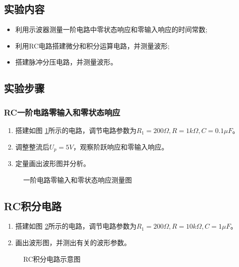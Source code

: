\documentclass[a4paper,11pt,UTF8]{ctexart}
\begin{document}
\subsection{实验内容}
\begin{itemize}
  \item 利用示波器测量一阶电路中零状态响应和零输入响应的时间常数;
  \item 利用RC电路搭建微分和积分运算电路，并测量波形;
  \item 搭建脉冲分压电路，并测量波形。
\end{itemize}
	
\subsection{实验步骤}
  \subsubsection{RC一阶电路零输入和零状态响应}
  \begin{enumerate}
    \item 搭建如图 \ref{fig:react}所示的电路，调节电路参数为$R_1=200\Omega,R=1k\Omega,C=0.1\mu F$。
    \item 调整整流后$U_p=5V$，观察阶跃响应和零输入响应。
    \item 定量画出波形图并分析。
  \end{enumerate}
  \begin{figure}[htbp]
    \centering
    \caption{一阶电路零输入和零状态响应测量图}
    \label{fig:react}
    \end{figure}
  \subsection{RC积分电路}
  \begin{enumerate}
    \item 搭建如图 \ref{fig:RCInt}所示的电路，调节电路参数为$R_1=200\Omega,R=10k\Omega,C=1\mu F$。
    \item 画出波形图，并测出有关的波形参数。
  \end{enumerate}
  \begin{figure}[htbp]
    \centering
    \caption{RC积分电路示意图}
    \label{fig:RCInt}
    \end{figure}
\end{document}

